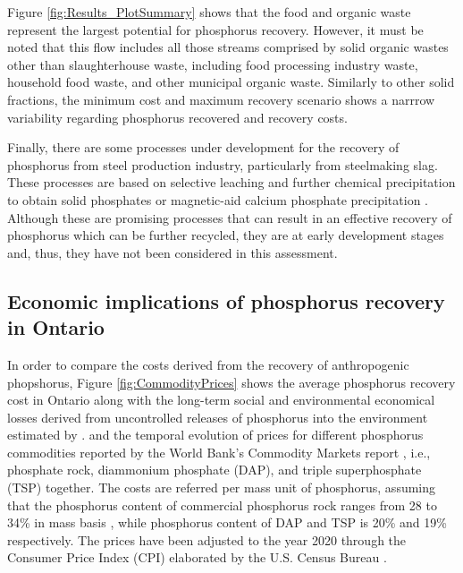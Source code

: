 \documentclass[authoryear]{elsarticle}
\begin{document}
Figure \ref{fig:Results_PlotSummary} shows that the food and organic waste represent the largest potential for phosphorus recovery. However, it must be noted that this flow includes all those streams comprised by solid organic wastes other than slaughterhouse waste, including food processing industry waste, household food waste, and other municipal organic waste. Similarly to other solid fractions, the minimum cost and maximum recovery scenario shows a narrrow variability regarding phosphorus recovered and recovery costs.

Finally, there are some processes under development for the recovery of phosphorus from steel production industry, particularly from steelmaking slag. These processes are based on selective leaching and further chemical precipitation to obtain solid phosphates \citep{du2022recovery, du2019separation} or magnetic-aid calcium phosphate precipitation \citep{yokoyama2007separation}. Although these are promising processes that can result in an effective recovery of phosphorus which can be further recycled, they are at early development stages and, thus, they have not been considered in this assessment.

\subsection{Economic implications of phosphorus recovery in Ontario}
In order to compare the costs derived from the recovery of anthropogenic phopshorus, Figure \ref{fig:CommodityPrices} shows the average phosphorus recovery cost in Ontario
along with the long-term social and environmental economical losses derived from uncontrolled releases of phosphorus into the environment estimated by \citet{sampat2021valuing}.
and
the temporal evolution of prices for different phosphorus commodities reported by the World Bank's Commodity Markets report \citep{CommoditiesPrices}, i.e., phosphate rock, diammonium phosphate (DAP), and triple superphosphate (TSP) together. The costs are referred per mass unit of phosphorus, assuming that the phosphorus content of commercial phosphorus rock ranges from 28 to 34\% in mass basis \citep{FAO_PUses, UMin_P}, while phosphorus content of DAP and TSP is 20\% and 19\% respectively. The prices have been adjusted to the year 2020 through the Consumer Price Index (CPI) elaborated by the U.S. Census Bureau \citep{CPIIndex}.
\end{document}
